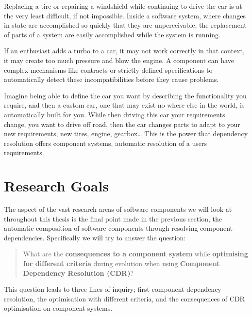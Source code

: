 \documentclass[a4paper]{report}
\begin{document}
Replacing a tire or repairing a windshield while continuing to drive the car is at the very least difficult, if not impossible.
Inside a software system, where changes in state are accomplished so quickly that they are unperceivable, the replacement of parts of a system are easily accomplished while the system is running.

If an enthusiast adds a turbo to a car, it may not work correctly in that context, it may create too much pressure and blow the engine.
A component can have complex mechanisms like contracts or strictly defined specifications to automatically detect these incompatibilities before they cause problems.

Imagine being able to define the car you want by describing the functionality you require, and then a custom car, one that may exist no where else in the world,
is automatically built for you. 
While then driving this car your requirements change, you want to drive off road, then the car changes parts to adapt to your new requirements, new tires, engine, gearbox\ldots
This is the power that dependency resolution offers component systems, automatic resolution of a users requirements.

\section{Research Goals}
{}The aspect of the vast research areas of software components we will look at throughout this thesis is the final point made in the previous section, 
{}the automatic composition of software components through resolving component dependencies.
{}Specifically we will try to answer the question:\\
{}\begin{quote}
{}What are the \textbf{consequences to a component system} while \textbf{optimising for different criteria} during evolution when using \textbf{Component Dependency Resolution (CDR)}?
{}\end{quote}

{}This question leads to three lines of inquiry; first component dependency resolution, the optimisation with different criteria, and the consequences of CDR optimisation on component systems.
\end{document}
